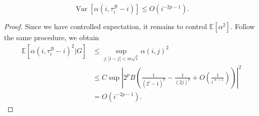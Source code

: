 \begin{lemma}
	\[
		\operatorname{Var} \left[ \alpha(i, \tau_i^{\mathcal{B}} - i) \right] \le    O(i^{- 2 p - 1})
	.\] 
	\label{lemma:variance-diagonal}
\end{lemma}
\begin{proof}
	Since we have controlled expectation, it remains to control $\mathbb{E} [\alpha^2]$. Follow the same procedure, we obtain
\begin{align*}
	 \mathbb{E}\left[ \alpha\left(i, \tau_i^{\mathcal{B}} - i\right)^2  | G\right]
	 &\le \sup _{j:|i - j| < m \sqrt{i} } \alpha(i,j)^2 \\
	 &\le C \sup \left| 2^p B \left( \frac{1}{(2^i - 1)^p}  - \frac{1}{(2j)^p} + O(\frac{1}{i^{\varkappa
	 + 1}}) \right) \right|^2  \\
	 &= O(i^{-2p-1}) 
.\end{align*}
\end{proof}

